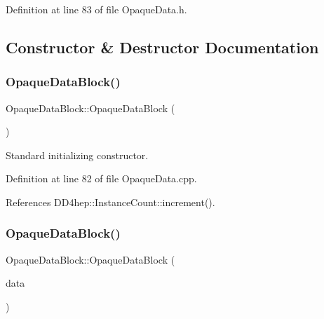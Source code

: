 Definition at line 83 of file Opaque\+Data.\+h.



\subsection{Constructor \& Destructor Documentation}
\hypertarget{class_d_d4hep_1_1_opaque_data_block_a1c0cf067c26869fcb636fbfed8002c73}{}\label{class_d_d4hep_1_1_opaque_data_block_a1c0cf067c26869fcb636fbfed8002c73} 
\subsubsection{\texorpdfstring{Opaque\+Data\+Block()}{OpaqueDataBlock()}\hspace{0.1cm}{\footnotesize\ttfamily [1/2]}}
{\footnotesize\ttfamily Opaque\+Data\+Block\+::\+Opaque\+Data\+Block (\begin{DoxyParamCaption}{ }\end{DoxyParamCaption})}



Standard initializing constructor. 



Definition at line 82 of file Opaque\+Data.\+cpp.



References D\+D4hep\+::\+Instance\+Count\+::increment().

\hypertarget{class_d_d4hep_1_1_opaque_data_block_a5c97af2f7c4130d78158040c2a95ab34}{}\label{class_d_d4hep_1_1_opaque_data_block_a5c97af2f7c4130d78158040c2a95ab34} 
\subsubsection{\texorpdfstring{Opaque\+Data\+Block()}{OpaqueDataBlock()}\hspace{0.1cm}{\footnotesize\ttfamily [2/2]}}
{\footnotesize\ttfamily Opaque\+Data\+Block\+::\+Opaque\+Data\+Block (\begin{DoxyParamCaption}\item[{const \hyperlink{class_d_d4hep_1_1_opaque_data_block}{Opaque\+Data\+Block} \&}]{data }\end{DoxyParamCaption})}




